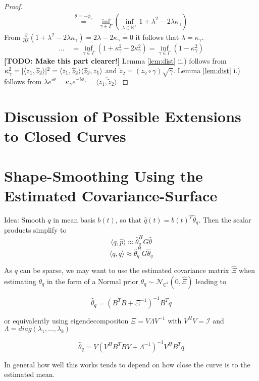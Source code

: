 \begin{proof}
\begin{align*}
     \overset{\theta = -\phi_\gamma}{=} & \inf_{\gamma \in \Gamma} \left( \inf_{\lambda \in \mathbb{R}^+} 1 + \lambda^2  - 2 \lambda \kappa_\gamma \right) 
  \end{align*}
  From $\frac{\partial}{\partial\lambda}\left( 1 + \lambda^2 - 2\lambda\kappa_\gamma \right) = 2\lambda - 2\kappa_\gamma \overset{!}{=} 0$ it follows that $\lambda = \kappa_\gamma$.
  $$\dots\quad = \inf_{\gamma \in \Gamma} \left( 1 + \kappa^2_\gamma  - 2 \kappa^2_\gamma \right) = \inf_{\gamma \in \Gamma} \left( 1 - \kappa^2_\gamma \right)$$
  \textbf{[TODO: Make this part clearer!]}
  Lemma \ref{lem:dist} ii.) follows from $\kappa^2_\gamma = \lvert\langle z_1, \widetilde z_2 \rangle\rvert^2 = \langle z_1, \widetilde z_2 \rangle \langle \widetilde z_2, z_1 \rangle$ and $\widetilde z_2 = (z_2 \circ \gamma) \sqrt{\dot\gamma}$.
  Lemma \ref{lem:dist} i.) follows from $\lambda e^{i\theta} = \kappa_\gamma e^{-i\phi_\gamma} = \overline{\langle z_1, \widetilde z_2 \rangle}$.
\end{proof}


\section{Discussion of Possible Extensions to Closed Curves}
\label{app:closed}


\section{Shape-Smoothing Using the Estimated Covariance-Surface}
\label{app:smooth}
Idea: Smooth $q$ in mean basis $b(t)$, so that $\hat{q}(t) = b(t)^T \hat{\theta}_q$. Then the scalar products simplify to
$$ \langle q, \hat{p} \rangle \approx \hat{\theta}_q^H G \hat{\theta} $$
$$ \langle q, q \rangle \approx \hat{\theta}_q^H G \hat{\theta}_q $$

As $q$ can be sparse, we may want to use the estimated covariance matrix $\hat{\Xi}$ when estimating $\theta_q$ in the form of a Normal prior $\theta_q \sim \mathcal{N}_{\mathbb{C}^k}(0, \hat\Xi)$ leading to

$$ \hat\theta_q = (B^T B + \Xi^{-1})^{-1} B^T q $$

or equivalently using eigendecompositon $\Xi = V \Lambda V^{-1}$ with $V^H V = \mathcal{I}$ and $\Lambda = diag(\lambda_1, \dots, \lambda_k)$

$$ \hat\theta_q = V ( V^H B^T B V + \Lambda^{-1})^{-1} V^H B^T q$$

In general how well this works tends to depend on how close the curve is to the estimated mean.

